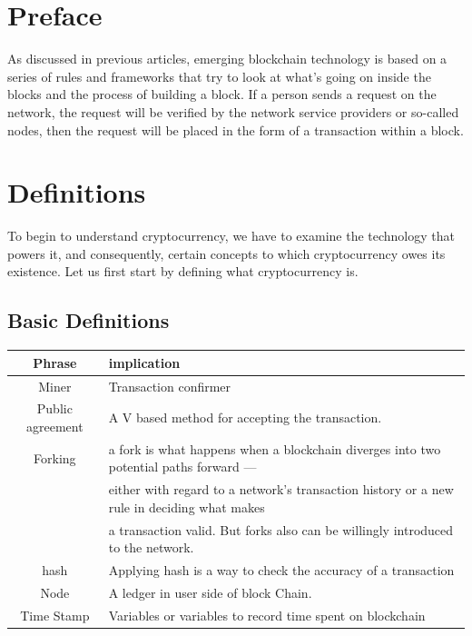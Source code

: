 \section{Preface}
As discussed in previous articles, emerging blockchain technology is based on a series of rules and frameworks that try to look at what's going on inside the blocks and the process of building a block.
If a person sends a request on the network, the request will be verified by the network service providers or so-called nodes, then the request will be placed in the form of a transaction within a block.

\section{Definitions}

To begin to understand cryptocurrency, we have to examine the technology that powers it, and consequently, certain concepts to which cryptocurrency owes its existence. Let us first start by defining what cryptocurrency is. 


\subsection{Basic Definitions}

\begin{table}\centering
    \renewcommand{\arraystretch}{2.5}

    \begin{tabular}{@{}c|l@{}}
            \bfseries Phrase & implication\\
            \hline\hline
            Miner
            & 
            Transaction confirmer\\
            Public agreement
            &
            A V based method for accepting the transaction.
            \\
            Forking 
            & a fork is what happens when a blockchain diverges into two potential paths forward — 
            \\
             
            &
            either with regard to a network's transaction history or a new rule in deciding what makes 
            \\
            
            &
            a transaction valid. But forks also can be willingly introduced to the network.
            \\
            hash 
            &
            Applying hash is a way to check the accuracy of a transaction
            \\
            Node
            &
            A ledger in user side of block Chain.
            \\
            Time Stamp
            &
            Variables or variables to record time spent on blockchain
    \end{tabular}
\end{table}
\pagebreak

